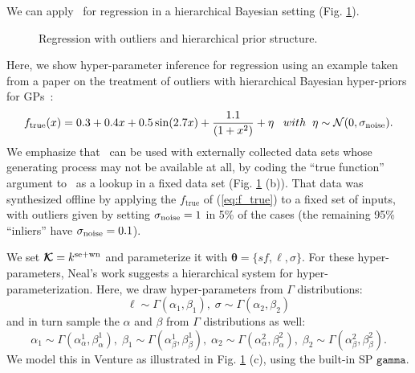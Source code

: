 We can apply \gpmem\ for regression in a hierarchical Bayesian setting
(Fig. \ref{fig:neal_tutorial}).  
\begin{figure}

\captionsetup{aboveskip=-7pt}
\caption{\footnotesize Regression with outliers and hierarchical prior
structure.}
\label{fig:neal_tutorial}
\end{figure}
Here, we show hyper-parameter inference for regression using an example
taken from a paper on the treatment of outliers with hierarchical
Bayesian hyper-priors for \ac{GP}s~\citep{neal1997monte}:
\begin{equation}
f_\text{true}(x) =  0.3 + 0.4 x + 0.5 \sin(2.7x) + \frac{1.1}{(1+ x^2)} + \eta
\;\;\; with\;\;\eta \sim \mathcal{N}(0,\sigma_{\text{noise}}). \label{eq:f_true}
\end{equation}
We emphasize that \gpmem\ can be used with externally collected
data sets whose generating process may not be available at all,
by coding the ``true function'' argument to \gpmem\ as a lookup
in a fixed data set (Fig. \ref{fig:neal_tutorial} (b)).
That data was synthesized offline by applying the $f_\text{true}$ of (\ref{eq:f_true})
to a fixed set of inputs, with outliers given by setting $\sigma_{\text{noise}} = 1$ in 5\% of
the cases (the remaining 95\% ``inliers'' have $\sigma_{\text{noise}} = 0.1$).

We set $\bm{\mathcal{K}} = k^{\text{se}+\text{wn}}$ and parameterize it with $\bm{\theta}=\{sf,\ell,\sigma\}$.
For these hyper-parameters, Neal's work suggests a hierarchical system for
hyper-parameterization.
Here, we draw hyper-parameters from $\Gamma$ distributions:
\begin{equation}
\label{eq:hyper-ell}
\ell \sim \Gamma(\alpha_1,\beta_1),\;\sigma \sim \Gamma(\alpha_2,\beta_2)
\end{equation} 
and in turn sample the $\alpha$ and $\beta$ from $\Gamma$ distributions as well:
\begin{equation}
\label{eq:hyper-alpha}
\alpha_1 \sim \Gamma(\alpha^1_{\alpha},\beta^1_{ \alpha } ),\;
\beta_1 \sim \Gamma(\alpha^1_{\beta},\beta^1_{ \beta } ),\;
\alpha_2 \sim \Gamma(\alpha^2_{\alpha},\beta^2_{\alpha}),\;
\beta_2 \sim \Gamma(\alpha^2_{\beta},\beta^2_{\beta}).
\end{equation}
We model this in Venture as illustrated in Fig. \ref{fig:neal_tutorial} (c),
using the built-in \ac{SP} $\texttt{gamma}$. 

